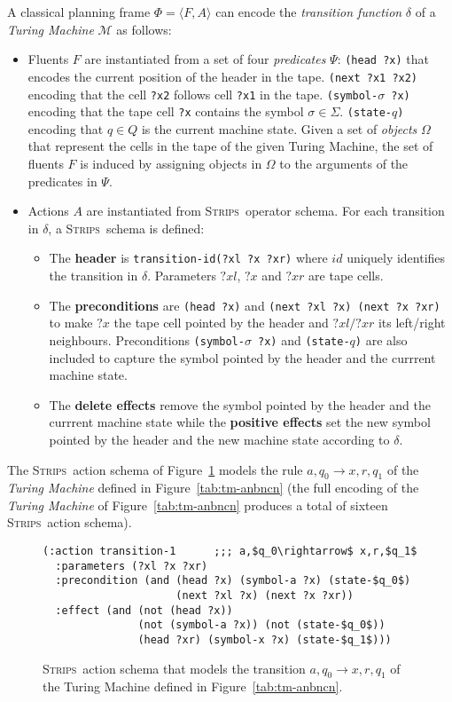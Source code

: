 \documentclass[letterpaper]{article} %
\newcommand{\tup}[1]{{\langle #1 \rangle}}
\newcommand{\strips}{\textsc{Strips}}     %
\begin{document}
A classical planning frame $\Phi=\tup{F,A}$ can encode the {\em transition function} $\delta$ of a {\em Turing Machine} $\mathcal{M}$ as follows:
\begin{itemize}
\item Fluents $F$ are instantiated from a set of four {\em predicates} $\Psi$: {\small\tt (head ?x)} that encodes the current position of the header in the tape. {\small\tt (next ?x1 ?x2)} encoding that the cell {\tt ?x2} follows cell {\tt ?x1} in the tape. {\small\tt (symbol-$\sigma$ ?x)} encoding that the tape cell {\tt ?x} contains the symbol $\sigma\in\Sigma$. {\small\tt (state-$q$)} encoding that $q\in Q$ is the current machine state. Given a set of {\em objects} $\Omega$ that represent the cells in the tape of the given Turing Machine, the set of fluents $F$ is induced by assigning objects in $\Omega$ to the arguments of the predicates in $\Psi$.
\item Actions $A$ are instantiated from \strips\ operator schema. For each transition in $\delta$, a \strips\ schema is defined:
\begin{itemize}
\item The {\bf header} is {\small\tt transition-id(?xl ?x ?xr)} where $id$ uniquely identifies the transition in $\delta$. Parameters $?xl$, $?x$ and $?xr$ are tape cells.
\item The {\bf preconditions} are {\small\tt(head ?x)} and {\small\tt (next ?xl ?x) (next ?x ?xr)} to make $?x$ the tape cell pointed by the header and $?xl/?xr$ its left/right neighbours. Preconditions {\small\tt(symbol-$\sigma$ ?x)} and {\small\tt (state-$q$)} are also included to capture the symbol pointed by the header and the currrent machine state.
\item The {\bf delete effects} remove the symbol pointed by the header and the currrent machine state while the {\bf positive effects} set the new symbol pointed by the header and the new machine state according to $\delta$.
\end{itemize}
\end{itemize}

The \strips\ action schema of Figure~\ref{fig:update-rule} models the rule $a,q_0\rightarrow x,r,q_1$ of the {\em Turing Machine} defined in Figure~\ref{tab:tm-anbncn} (the full encoding of the {\em Turing Machine} of Figure~\ref{tab:tm-anbncn} produces a total of sixteen \strips\ action schema). 
\begin{figure}[hbt!]
\begin{scriptsize}
\begin{lstlisting}
(:action transition-1      ;;; a,$q_0\rightarrow$ x,r,$q_1$
  :parameters (?xl ?x ?xr)
  :precondition (and (head ?x) (symbol-a ?x) (state-$q_0$)
                     (next ?xl ?x) (next ?x ?xr))
  :effect (and (not (head ?x)) 
               (not (symbol-a ?x)) (not (state-$q_0$))
               (head ?xr) (symbol-x ?x) (state-$q_1$)))
\end{lstlisting}
\end{scriptsize}
 \caption{\small \strips\ action schema that models the transition $a,q_0\rightarrow x,r,q_1$ of the Turing Machine defined in Figure~\ref{tab:tm-anbncn}.}
\label{fig:update-rule}
\end{figure}
\end{document}
